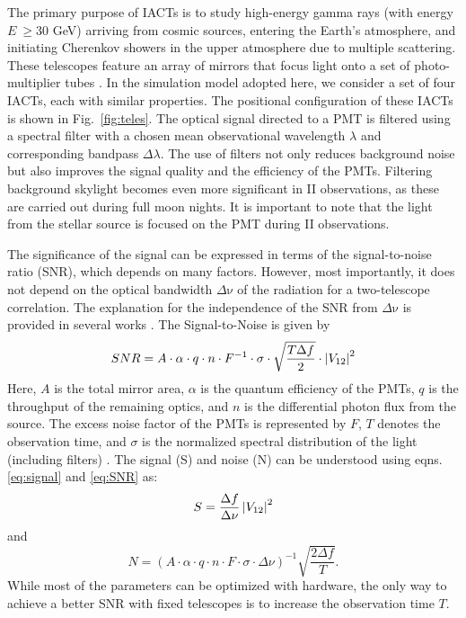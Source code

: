 The primary purpose of IACTs is to study high-energy gamma rays (with energy $E\ \geq 30$ GeV) arriving from cosmic sources, entering the Earth's atmosphere, and initiating Cherenkov showers in the upper atmosphere due to multiple scattering. These telescopes feature an array of mirrors that focus light onto a set of photo-multiplier tubes \citep[PMTs, see e.g.,][]{aleksic2016major}. In the simulation model adopted here, we consider a set of four IACTs, each with similar properties. The positional configuration of these IACTs is shown in Fig.~\ref{fig:teles}. The optical signal directed to a PMT is filtered using a spectral filter with a chosen mean observational wavelength $\lambda$ and corresponding bandpass $\Delta \lambda$. The use of filters not only reduces background noise but also improves the signal quality and the efficiency of the PMTs. Filtering background skylight becomes even more significant in II observations, as these are carried out during full moon nights. It is important to note that the light from the stellar source is focused on the PMT during II observations.

The significance of the signal can be expressed in terms of the signal-to-noise ratio (SNR), which depends on many factors. However, most importantly, it does not depend on the optical bandwidth $\Delta {\mathrm {\nu}}$ of the radiation for a two-telescope correlation. The explanation for the independence of the SNR from $\Delta {\mathrm {\nu}}$ is provided in several works \citep[e.g., subsection 4.1 of][]{10.1093/mnras/stab2391}.  The Signal-to-Noise is given by
\begin{equation}
	SNR = A \cdot \alpha \cdot q \cdot n \cdot F^{-1} \cdot \sigma \cdot \sqrt{\frac{T \Delta f}{2}} \cdot \left|V_{12}\right|^{2}
	\label{eq:SNR}
\end{equation}
Here, $A$ is the total mirror area, $\alpha$ is the quantum efficiency of the PMTs, $q$ is the throughput of the remaining optics, and $n$ is the differential photon flux from the source. The excess noise factor of the PMTs is represented by $F$, $T$ denotes the observation time, and $\sigma$ is the normalized spectral distribution of the light (including filters) \citep[e.g.,][]{acciari2020optical}. The signal (S) and noise (N) can be understood using eqns.\ref{eq:signal} and \ref{eq:SNR} as:
\begin{equation}
	S = \frac{\Delta f}{\Delta \nu} \left|V_{12}\right|^2
\end{equation}
and
\begin{equation}
	N = (A \cdot \alpha \cdot q \cdot n \cdot F \cdot \sigma \cdot \Delta \nu)^{-1}\sqrt{\frac{2 \Delta f}{T}}.
\end{equation}
While most of the parameters can be optimized with hardware, the only way to achieve a better SNR with fixed telescopes is to increase the observation time $T$.

